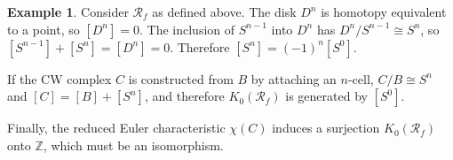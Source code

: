 \documentclass[10pt,a4paper]{article}
\theoremstyle{definition}
\newtheorem{example}[theorem]{Example}
\begin{document}
\begin{example}
Consider $\mathcal{R}_f$ as defined above. The disk $D^n$ is homotopy equivalent to a point, so $[D^n] = 0$. The inclusion of $S^{n-1}$ into $D^n$ has $D^n/S^{n-1} \cong S^n$, so $[S^{n-1}] + [S^n] = [D^n] = 0$. Therefore $[S^n] = (-1)^n [S^0]$.

If the CW complex $C$ is constructed from $B$ by attaching an $n$-cell, $C/B \cong S^n$ and $[C] = [B] + [S^n]$, and therefore $K_0(\mathcal{R}_f)$ is generated by $[S^0]$.

Finally, the reduced Euler characteristic $\chi(C)$ induces a surjection $K_0(\mathcal{R}_f)$ onto $\mathbb{Z}$, which must be an isomorphism.
\end{example}

\newpage
\printbibliography
\end{document}
